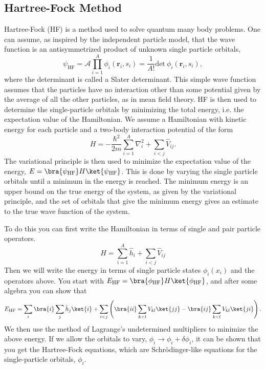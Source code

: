 \subsection{Hartree-Fock Method}
\label{sec:hf}
Hartree-Fock (HF) is a method used to solve quantum many body problems. One can assume, as inspired by the independent particle model, that the wave function is an antisymmetrized product of unknown single particle orbitals,
\begin{equation}
   \psi_{\mathrm{HF}} = \mathcal{A} \prod\limits_{i=1}^A \phi_i(\mathbf{r}_i,s_i) = \frac{1}{A!} \mathrm{det}~\phi_i(\mathbf{r}_i,s_i),
\end{equation}
where the determinant is called a Slater determinant. This simple wave function assumes that the particles have no interaction other than some potential given by the average of all the other particles, as in mean field theory. HF is then used to determine the single-particle orbitals by minimizing the total energy, i.e. the expectation value of the Hamiltonian. We assume a Hamiltonian with kinetic energy for each particle and a two-body interaction potential of the form
\begin{equation}
   H=-\frac{\hbar^2}{2m}\sum\limits_{i=1}^A \nabla_i^2 + \sum\limits_{i<j} \hat{V}_{ij}.
\end{equation}
The variational principle is then used to minimize the expectation value of the energy, $E = \bra{\psi_{\mathrm{HF}}} H \ket{\psi{_\mathrm{HF}}}$. This is done by varying the single particle orbitals until a minimum in the energy is reached. The minimum energy is an upper bound on the true energy of the system, as given by the variational principle, and the set of orbitals that give the minimum energy gives an estimate to the true wave function of the system.

To do this you can first write the Hamiltonian in terms of single and pair particle operators.
\begin{equation}
   H = \sum\limits_{i=1}^A \hat{h}_i + \sum\limits_{i<j} \hat{V}_{ij}
\end{equation}
Then we will write the energy in terms of single particle states $\phi_i(x_i)$ and the operators above. You start with $E_\mathrm{HF}=\bra{\phi_\mathrm{HF}}H\ket{\phi_\mathrm{HF}}$, and after some algebra you can show that
\begin{equation}
   E_\mathrm{HF} = \sum\limits_{i} \bra{i}\sum\limits_j\hat{h}_j\ket{i} + \sum\limits_{i<j} \left(\bra{ii}\sum\limits_{k<l}V_{kl}\ket{jj}-\bra{ij}\sum\limits_{k<l}V_{kl}\ket{ji}\right).
\end{equation}
We then use the method of Lagrange's undetermined multipliers to minimize the above energy. If we allow the orbitals to vary, $\phi_i \rightarrow \phi_i + \delta\phi_i$, it can be shown that you get the Hartree-Fock equations, which are Schr\"odinger-like equations for the single-particle orbitals, $\phi_i$.

